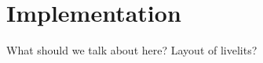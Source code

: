 \section{Implementation}\label{sec:implementation}
What should we talk about here? Layout of livelits? 